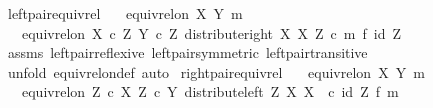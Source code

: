 \begin{isabellebody}
%
\endisatagproof
{\isafoldproof}%
%
\isadelimproof
\isanewline
%
\endisadelimproof
\isanewline
{}\isamarkupfalse%
\ left{\isacharunderscore}{\kern0pt}pair{\isacharunderscore}{\kern0pt}equiv{\isacharunderscore}{\kern0pt}rel{\isacharcolon}{\kern0pt}\isanewline
\ \ \ {\isachardoublequoteopen}equiv{\isacharunderscore}{\kern0pt}rel{\isacharunderscore}{\kern0pt}on\ X\ {\isacharparenleft}{\kern0pt}Y{\isacharcomma}{\kern0pt}\ m{\isacharparenright}{\kern0pt}{\isachardoublequoteclose}\isanewline
\ \ \ {\isachardoublequoteopen}equiv{\isacharunderscore}{\kern0pt}rel{\isacharunderscore}{\kern0pt}on\ {\isacharparenleft}{\kern0pt}X\ {\isasymtimes}\isactrlsub c\ Z{\isacharparenright}{\kern0pt}\ {\isacharparenleft}{\kern0pt}Y\ {\isasymtimes}\isactrlsub c\ Z{\isacharcomma}{\kern0pt}\ distribute{\isacharunderscore}{\kern0pt}right\ X\ X\ Z\ {\isasymcirc}\isactrlsub c\ {\isacharparenleft}{\kern0pt}m\ {\isasymtimes}\isactrlsub f\ id\ Z{\isacharparenright}{\kern0pt}{\isacharparenright}{\kern0pt}{\isachardoublequoteclose}\isanewline
%
\isadelimproof
\ \ %
\endisadelimproof
%
\isatagproof
{}\isamarkupfalse%
\ assms\ left{\isacharunderscore}{\kern0pt}pair{\isacharunderscore}{\kern0pt}reflexive\ left{\isacharunderscore}{\kern0pt}pair{\isacharunderscore}{\kern0pt}symmetric\ left{\isacharunderscore}{\kern0pt}pair{\isacharunderscore}{\kern0pt}transitive\isanewline
\ \ \isamarkupfalse%
\ {\isacharparenleft}{\kern0pt}unfold\ equiv{\isacharunderscore}{\kern0pt}rel{\isacharunderscore}{\kern0pt}on{\isacharunderscore}{\kern0pt}def{\isacharcomma}{\kern0pt}\ auto{\isacharparenright}{\kern0pt}%
\endisatagproof
{\isafoldproof}%
%
\isadelimproof
\isanewline
%
\endisadelimproof
\isanewline
{}\isamarkupfalse%
\ right{\isacharunderscore}{\kern0pt}pair{\isacharunderscore}{\kern0pt}equiv{\isacharunderscore}{\kern0pt}rel{\isacharcolon}{\kern0pt}\isanewline
\ \ \ {\isachardoublequoteopen}equiv{\isacharunderscore}{\kern0pt}rel{\isacharunderscore}{\kern0pt}on\ X\ {\isacharparenleft}{\kern0pt}Y{\isacharcomma}{\kern0pt}\ m{\isacharparenright}{\kern0pt}{\isachardoublequoteclose}\isanewline
\ \ \ {\isachardoublequoteopen}equiv{\isacharunderscore}{\kern0pt}rel{\isacharunderscore}{\kern0pt}on\ {\isacharparenleft}{\kern0pt}Z\ {\isasymtimes}\isactrlsub c\ X{\isacharparenright}{\kern0pt}\ {\isacharparenleft}{\kern0pt}Z\ {\isasymtimes}\isactrlsub c\ Y{\isacharcomma}{\kern0pt}\ distribute{\isacharunderscore}{\kern0pt}left\ Z\ X\ X\ \ {\isasymcirc}\isactrlsub c\ {\isacharparenleft}{\kern0pt}id\ Z\ {\isasymtimes}\isactrlsub f\ m{\isacharparenright}{\kern0pt}{\isacharparenright}{\kern0pt}{\isachardoublequoteclose}\isanewline

\end{isabellebody}
